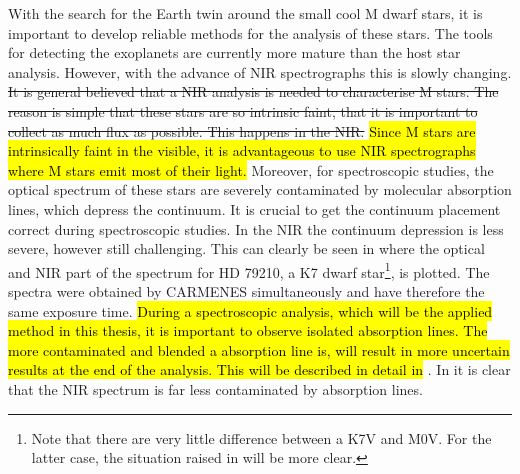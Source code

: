 With the search for the Earth twin around the small cool M dwarf stars, it is important to develop
reliable methods for the analysis of these stars. The tools for detecting the exoplanets are
currently more mature than the host star analysis. However, with the advance of NIR spectrographs
this is slowly changing. \st{It is general believed that a NIR analysis is needed to characterise M
stars. The reason is simple that these stars are so intrinsic faint, that it is important to collect
as much flux as possible. This happens in the NIR.} \hl{Since M stars are intrinsically faint in the
visible, it is advantageous to use NIR spectrographs where M stars emit most of their light.}
Moreover, for spectroscopic studies, the optical spectrum of these stars are severely contaminated
by molecular absorption lines, which depress the continuum. It is crucial to get the continuum
placement correct during spectroscopic studies. In the NIR the continuum depression is less severe,
however still challenging. This can clearly be seen in  where the optical and
NIR part of the spectrum for HD 79210, a K7 dwarf star\footnote{Note that there are very little
difference between a K7V and M0V. For the latter case, the situation raised in
 will be more clear.}, is plotted. The spectra were obtained by CARMENES
simultaneously and have therefore the same exposure time. \hl{During a spectroscopic analysis, which
will be the applied method in this thesis, it is important to observe isolated absorption lines. The
more contaminated and blended a absorption line is, will result in more uncertain results at the end
of the analysis. This will be described in detail in} . In
 it is clear that the NIR spectrum is far less contaminated by absorption
lines.

